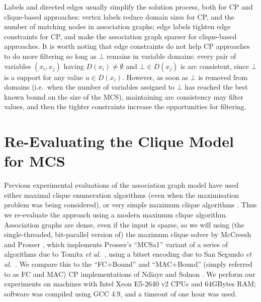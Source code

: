 \documentclass{llncs}
\begin{document}
Labels and directed edges usually simplify the solution process, both for CP and clique-based
approaches: vertex labels reduce domain sizes for CP, and the number of matching nodes in
association graphs; edge labels tighten edge constraints for CP, and make the association graph
sparser for clique-based approaches. It is worth noting that edge constraints do not help CP
approaches to do more filtering so long as $\bot$ remains in variable domains: every pair of
variables $(x_i, x_j)$ having  $D(x_i) \neq \emptyset$ and $\bot \in D(x_j)$ is arc consistent,
since $\bot$ is a support for any value $u \in D(x_i)$. However, as soon as $\bot$ is removed from
domains (i.e.\ when the number of variables assigned to $\bot$ has reached the best known bound on
the size of the MCS), maintaining arc consistency may filter values, and then the tighter constraints
increase the opportunities for filtering.

\section{Re-Evaluating the Clique Model for MCS}\label{eval1}

Previous experimental evaluations of the association graph model have used either maximal clique
enumeration algorithms \cite{DBLP:journals/tcs/Koch01,DBLP:conf/mco/VismaraV08} (even when the
maximisation problem was being considered), or very simple maximum clique algorithms
\cite{DBLP:conf/sspr/BunkeFGSV02,DBLP:journals/jgaa/ConteFV07}. Thus we re-evaluate the approach
using a modern maximum clique algorithm. Association graphs are dense, even if the input is sparse,
so we will using (the single-threaded, bit-parallel version of) the maximum clique solver by
McCreesh and Prosser \cite{DBLP:journals/topc/McCreeshP15}, which implements Prosser's
\cite{DBLP:journals/algorithms/Prosser12} ``MCSa1'' variant of a series of algorithms due to Tomita
\textit{et al.}\
\cite{DBLP:conf/dmtcs/TomitaS03,DBLP:journals/jgo/TomitaK07,DBLP:conf/walcom/TomitaSHTW10}, using a
bitset encoding due to San Segundo \textit{et al.}\
\cite{DBLP:journals/cor/SegundoRJ11,DBLP:journals/ol/SegundoMRH13}. We compare this to the
``FC+Bound'' and ``MAC+Bound'' (simply referred to as FC and MAC) CP implementations of Ndiaye and
Solnon \cite{DBLP:conf/cp/NdiayeS11}.  We perform our experiments on machines with Intel Xeon
E5-2640 v2 CPUs and 64GBytes RAM; software was compiled using GCC 4.9, and a timeout of one hour was
used.
\end{document}
